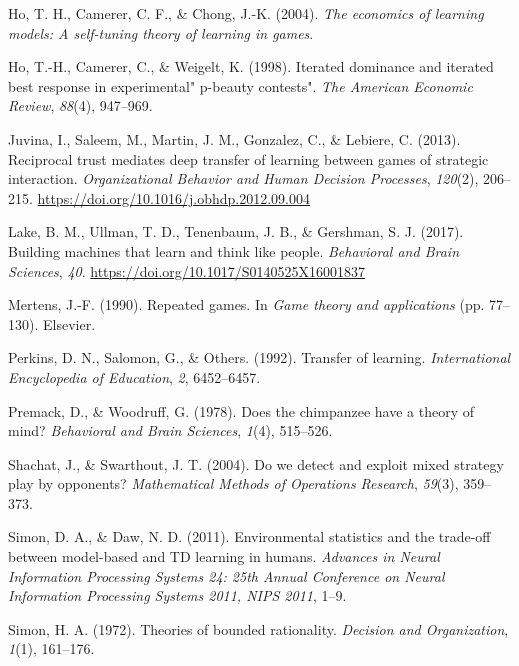 \documentclass[man,floatsintext]{apa6}
\begin{document}
\leavevmode\hypertarget{ref-ho2004economics}{}%
Ho, T. H., Camerer, C. F., \& Chong, J.-K. (2004). \emph{The economics of learning models: A self-tuning theory of learning in games}.

\leavevmode\hypertarget{ref-ho1998iterated}{}%
Ho, T.-H., Camerer, C., \& Weigelt, K. (1998). Iterated dominance and iterated best response in experimental" p-beauty contests". \emph{The American Economic Review}, \emph{88}(4), 947--969.

\leavevmode\hypertarget{ref-Juvina2013}{}%
Juvina, I., Saleem, M., Martin, J. M., Gonzalez, C., \& Lebiere, C. (2013). Reciprocal trust mediates deep transfer of learning between games of strategic interaction. \emph{Organizational Behavior and Human Decision Processes}, \emph{120}(2), 206--215. \url{https://doi.org/10.1016/j.obhdp.2012.09.004}

\leavevmode\hypertarget{ref-Lake2017}{}%
Lake, B. M., Ullman, T. D., Tenenbaum, J. B., \& Gershman, S. J. (2017). Building machines that learn and think like people. \emph{Behavioral and Brain Sciences}, \emph{40}. \url{https://doi.org/10.1017/S0140525X16001837}

\leavevmode\hypertarget{ref-mertens1990repeated}{}%
Mertens, J.-F. (1990). Repeated games. In \emph{Game theory and applications} (pp. 77--130). Elsevier.

\leavevmode\hypertarget{ref-perkins1992transfer}{}%
Perkins, D. N., Salomon, G., \& Others. (1992). Transfer of learning. \emph{International Encyclopedia of Education}, \emph{2}, 6452--6457.

\leavevmode\hypertarget{ref-premack1978does}{}%
Premack, D., \& Woodruff, G. (1978). Does the chimpanzee have a theory of mind? \emph{Behavioral and Brain Sciences}, \emph{1}(4), 515--526.

\leavevmode\hypertarget{ref-shachat2004we}{}%
Shachat, J., \& Swarthout, J. T. (2004). Do we detect and exploit mixed strategy play by opponents? \emph{Mathematical Methods of Operations Research}, \emph{59}(3), 359--373.

\leavevmode\hypertarget{ref-Simon_Daw_11}{}%
Simon, D. A., \& Daw, N. D. (2011). Environmental statistics and the trade-off between model-based and TD learning in humans. \emph{Advances in Neural Information Processing Systems 24: 25th Annual Conference on Neural Information Processing Systems 2011, NIPS 2011}, 1--9.

\leavevmode\hypertarget{ref-simon1972theories}{}%
Simon, H. A. (1972). Theories of bounded rationality. \emph{Decision and Organization}, \emph{1}(1), 161--176.
\end{document}
